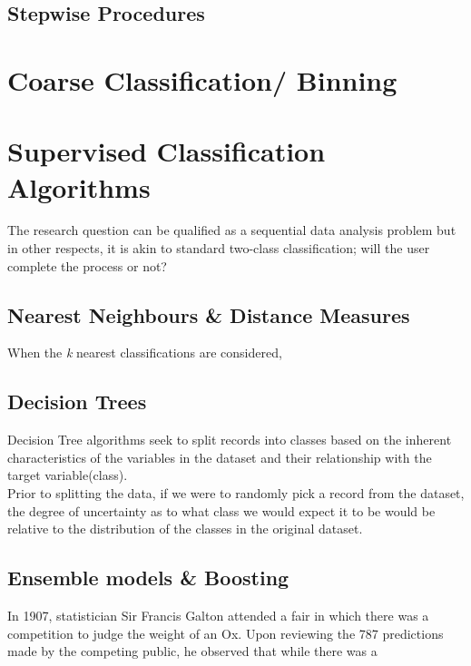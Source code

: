\subsection{Stepwise Procedures}




\section{Coarse Classification/ Binning}
\section{Supervised Classification Algorithms}
The research question can be qualified as a sequential data analysis problem but in other respects, it is akin to standard two-class classification; will the user complete the process or not?

\subsection{Nearest Neighbours \& Distance Measures} \label{kNN}
When the \textit{k} nearest classifications are considered, 


\subsection{Decision Trees} \label{decTrees}
Decision Tree algorithms seek to split records into classes based on the inherent characteristics of the variables in the dataset and their relationship with the target variable(class).\\Prior to splitting the data, if we were to randomly pick a record from the dataset, the degree of uncertainty as to what class we would expect it to be would be relative to the distribution of the classes in the original dataset.


\subsection{Ensemble models \& Boosting} \label{boosting}
In 1907, statistician Sir Francis Galton attended a fair in which there was a competition to judge the weight of an Ox. Upon reviewing the 787 predictions made by the competing public, he observed that while there was a 


